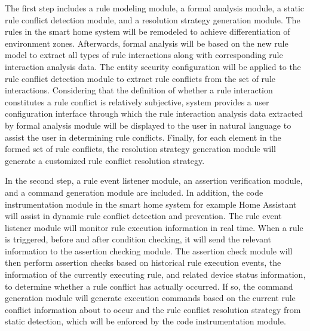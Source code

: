 The first step includes a rule modeling module, a formal analysis module, a static rule conflict detection module, and a resolution strategy generation module. The rules in the smart home system will be remodeled to achieve differentiation of environment zones. Afterwards, formal analysis will be based on the new rule model to extract all types of rule interactions along with corresponding rule interaction analysis data. The entity security configuration will be applied to the rule conflict detection module to extract rule conflicts from the set of rule interactions. Considering that the definition of whether a rule interaction constitutes a rule conflict is relatively subjective, system provides a user configuration interface through which the rule interaction analysis data extracted by formal analysis module will be displayed to the user in natural language to assist the user in determining rule conflicts. Finally, for each element in the formed set of rule conflicts, the resolution strategy generation module will generate a customized rule conflict resolution strategy.

In the second step, a rule event listener module, an assertion verification module, and a command generation module are included. In addition, the code instrumentation module in the smart home system for example Home Assistant will assist in dynamic rule conflict detection and prevention. The rule event listener module will monitor rule execution information in real time. When a rule is triggered, before and after condition checking, it will send the relevant information to the assertion checking module. The assertion check module will then perform assertion checks based on historical rule execution events, the information of the currently executing rule, and related device status information, to determine whether a rule conflict has actually occurred. If so, the command generation module will generate execution commands based on the current rule conflict information about to occur and the rule conflict resolution strategy from static detection, which will be enforced by the code instrumentation module.


